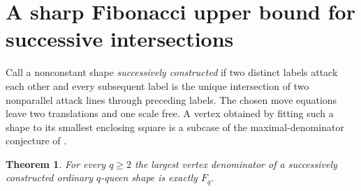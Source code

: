 \documentclass[11pt]{article}
\newtheorem{theorem}{Theorem}
\begin{document}
\section{A sharp Fibonacci upper bound for successive intersections}
Call a nonconstant shape \emph{successively constructed} if two distinct labels attack each other and every subsequent label is the unique intersection of two nonparallel attack lines through preceding labels. The chosen move equations leave two translations and one scale free. A vertex obtained by fitting such a shape to its smallest enclosing square is a subcase of the maximal-denominator conjecture of \cite[Conj.~6.1]{chz}.
\begin{theorem}\label{t:upper}
For every $q\ge2$ the largest vertex denominator of a successively constructed ordinary $q$-queen shape is exactly $F_q$.
\end{theorem}
\end{document}
